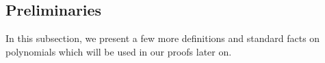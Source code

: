 \documentclass[11pt]{article}
\newcommand{\Boo}{\{0,1 \}}
\newcommand{\bigO}{\mathcal{O}}
\newcommand{\F}{\mathbb{F}}
\renewcommand{\comment}[2]{\marginpar{\tiny{\textbf{#1: }\textit{#2}}}}
\newcommand{\nl}[1]{\comment{NL}{#1}}
\newcommand{\IPSLIN}{\mathrm{IPS}_{\mathrm{LIN}}}
\newcommand{\ml}{\mathsf{ml}}
\begin{document}





\subsection{Preliminaries}
In this subsection, we present a few more definitions and standard facts on polynomials which will be used in our proofs later on.\\
\end{document}
